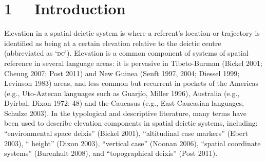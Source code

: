 \section[1 \ \ Introduction]{1 \ \ Introduction\footnotemark{}}
\hypertarget{Toc376958886}{}
Elevation in a spatial deictic system is where a referent{\textquoteright}s location or trajectory is identified as being at a certain elevation relative to the deictic centre (abbreviated as {\textquoteleft}\textsc{dc}{\textquoteright}). Elevation is a common component of systems of spatial reference in several language areas: it is pervasive in Tibeto-Burman (Bickel 2001; Cheung 2007; Post 2011) and New Guinea (Senft 1997, 2004; Diessel 1999; Levinson 1983) areas, and less common but recurrent in pockets of the Americas (e.g., Uto-Aztecan languages such as Guarj\'io, Miller 1996), Australia (e.g., Dyirbal, Dixon 1972: 48) and the Caucasus (e.g., East Caucasian languages, Schulze 2003). In the typological and descriptive literature, many terms have been used to describe elevation components in spatial deictic systems, including: {\textquotedblleft}environmental space deixis{\textquotedblright} (Bickel 2001), {\textquotedblleft}altitudinal case markers{\textquotedblright} (Ebert 2003), {\textquotedblleft}
height{\textquotedblright} (Dixon 2003), {\textquotedblleft}vertical case{\textquotedblright} (Noonan 2006), {\textquotedblleft}spatial coordinate systems{\textquotedblright} (Burenhult 2008), and {\textquotedblleft}topographical deixis{\textquotedblright} (Post 2011). 

